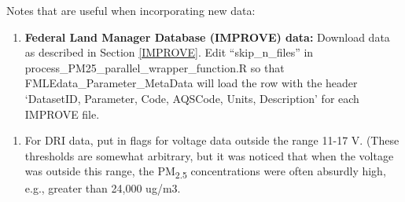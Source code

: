 \begin{enumerate}[nolistsep]
Notes that are useful when incorporating new data:
\begin{enumerate}
\item \textbf{Federal Land Manager Database (IMPROVE) data:} Download data as described in Section \ref{IMPROVE}. Edit ``skip\_n\_files'' in process\_PM25\_parallel\_wrapper\_function.R so that FMLEdata\_Parameter\_MetaData will load the row with the header `DatasetID, Parameter, Code, AQSCode, Units, Description' for each IMPROVE file.
\end{enumerate}

	\begin{enumerate}
	\item For DRI data, put in flags for voltage data outside the range 11-17 V. (These thresholds are somewhat arbitrary, but it was noticed that when the voltage was outside this range, the PM\textsubscript{2.5} concentrations were often absurdly high, e.g., greater than 24,000 ug/m3.
	\end{enumerate}


\end{enumerate}
